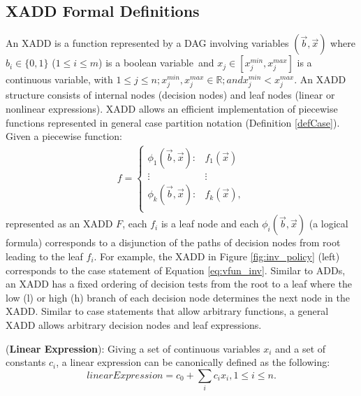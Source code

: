 \documentclass[twoside,11pt]{article}
\newenvironment{mydef}[1][Definition]{\begin{trivlist}
\item[\hskip \labelsep {\bfseries #1}]}{\end{trivlist}}
\begin{document}
\subsection{XADD Formal Definitions}
\label{xaddformal}
An XADD is a function represented by a DAG involving variables $(\vec{b},\vec{x})$ where $b_i \in \{ 0,1 \}$ ($1 \leq i \leq m$) is a  boolean variable$\,$
and $x_j \in \left[ x_j^{min}, x_j^{max}\right]$ is a continuous variable, with $1 \leq j \leq n; x_j^{min}, x_j^{max} \in \mathbb{R}; and  x_j^{min}< x_j^{max}$.
An XADD structure consists of internal nodes (decision nodes) and leaf nodes (linear or nonlinear expressions).
XADD allows an efficient implementation of piecewise functions represented in general case partition notation (Definition \ref{defCase}).
{%
Given a piecewise function:
\begin{align}
f = 
\begin{cases}
  \phi_1(\vec{b},\vec{x}): & f_1 (\vec{x})\\ 
 \vdots&\vdots\\ 
  \phi_k(\vec{b},\vec{x}): & f_k(\vec{x}), \\ 
\end{cases} \label{eq:function_xadd}
\end{align}
}
represented as an XADD $F$, each $f_i$ is a leaf node and each $\phi_i(\vec{b},\vec{x})$ (a logical formula) corresponds to a disjunction of the paths of decision nodes from root leading to the leaf $f_i$. For example, the XADD in Figure \ref{fig:inv_policy} (left) corresponds to the case statement of Equation \ref{eq:vfun_inv}.
Similar to ADDs, an XADD has a fixed ordering of decision tests from the root to a leaf where the low (l) or high (h) branch of each decision node determines the next node in the XADD. Similar to case statements that allow arbitrary functions,  a general XADD allows arbitrary decision nodes and leaf expressions. 

\begin{mydef}(\textbf{Linear Expression}):
Giving a set of continuous variables $x_i$ and a set of constants $c_i$, a linear expression can be canonically defined  as the following:
\begin{equation}
\mathit{linearExpression} = c_0+\sum_{i} c_i x_i , 1 \leq i \leq n. 
\label{Eq:canonical}
\end{equation}
\end{mydef}
\end{document}
